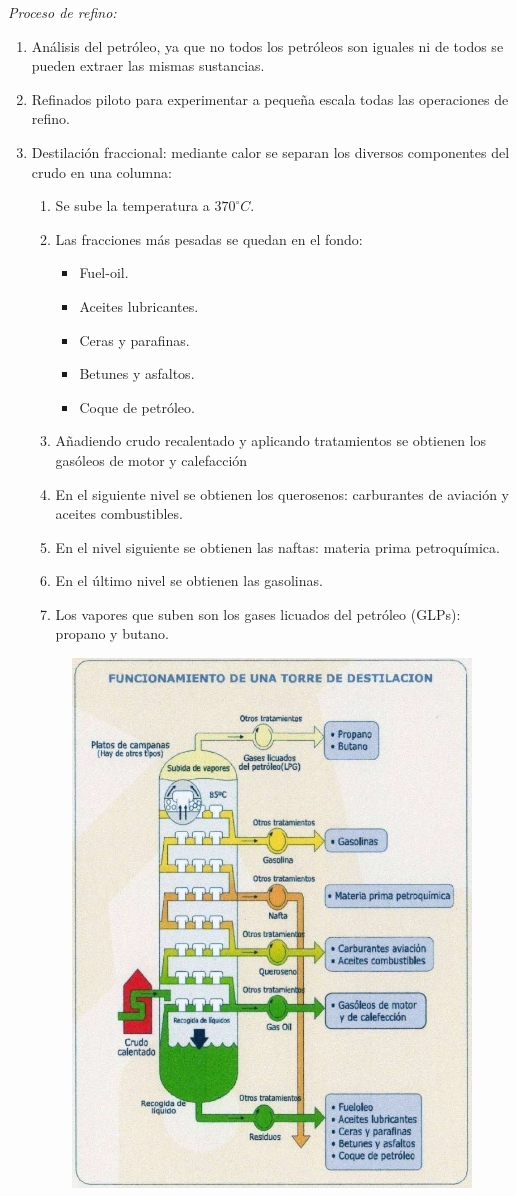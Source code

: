 			
			\textit{Proceso de refino:}
			\begin{enumerate}
				\item Análisis del petróleo, ya que no todos los petróleos son iguales ni de todos se pueden extraer las mismas sustancias.
				\item Refinados piloto para experimentar a pequeña escala todas las operaciones de refino.
				\item Destilación fraccional: mediante calor se separan los diversos componentes del crudo en una columna:
				\begin{enumerate}
					\item Se sube la temperatura a $370^\circ C$.
					\item Las fracciones más pesadas se quedan en el fondo:
					\begin{itemize}
						\item Fuel-oil.
						\item Aceites lubricantes.
						\item Ceras y parafinas.
						\item Betunes y asfaltos.
						\item Coque de petróleo.
					\end{itemize}
					\item Añadiendo crudo recalentado y aplicando tratamientos se obtienen los gasóleos de motor y calefacción
					\item En el siguiente nivel se obtienen los querosenos: carburantes de aviación y aceites combustibles.
					\item En el nivel siguiente se obtienen las naftas: materia prima petroquímica.
					\item En el último nivel se obtienen las gasolinas.
					\item Los vapores que suben son los gases licuados del petróleo (GLPs): propano y butano.
				\end{enumerate}
				\begin{figure}
					\centering
					\includegraphics[width=0.6\linewidth]{res/tema1/destilacionPetroleo}
				\end{figure}
				 
			\end{enumerate} 
		
